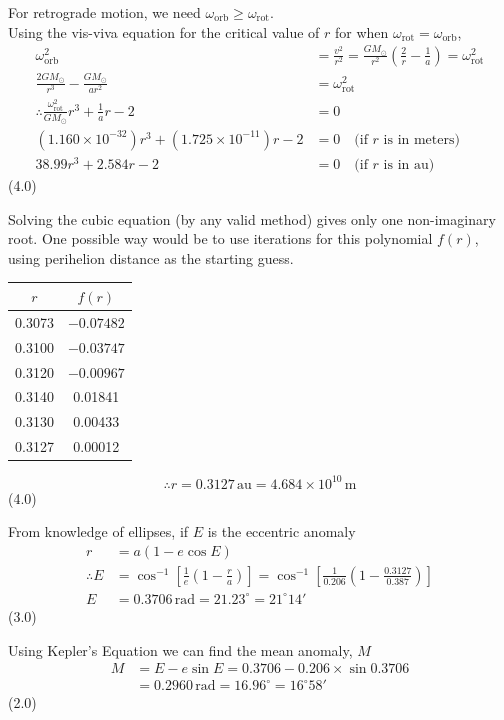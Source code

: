 For retrograde motion, we need $\omega_{\mathrm{orb}} \ge \omega_{\mathrm{rot}}$.\\
Using the vis-viva equation for the critical value of $r$ for when
$\omega_{\mathrm{rot}} = \omega_{\mathrm{orb}}$,
\begin{align*}
\omega_{\mathrm{orb}}^2 &= \frac{v^2}{r^2}
  = \frac{GM_\odot}{r^2}\left(\frac{2}{r} - \frac{1}{a}\right) = \omega_{\mathrm{rot}}^2\\
\frac{2GM_\odot}{r^3} - \frac{GM_\odot}{ar^2} &= \omega_{\mathrm{rot}}^2\\
\therefore \frac{\omega_{\mathrm{rot}}^2}{GM_\odot}r^3 + \frac{1}{a}r - 2 &= 0\\
(1.160\times10^{-32})r^3 + (1.725\times10^{-11})r - 2 &= 0 \quad
  \text{(if $r$ is in meters)}\\
38.99r^3 + 2.584r - 2 &= 0 \quad \text{(if $r$ is in au)}
\end{align*}
\hfill(4.0)

Solving the cubic equation (by any valid method) gives only one non-imaginary root.
One possible way would be to use iterations for this polynomial $f(r)$, using perihelion
distance as the starting guess.
\begin{center}
\begin{tabular}{c|c}
$r$ & $f(r)$\\
\hline
0.3073 & $-0.07482$\\
0.3100 & $-0.03747$\\
0.3120 & $-0.00967$\\
0.3140 & 0.01841\\
0.3130 & 0.00433\\
0.3127 & 0.00012\\
\end{tabular}
\end{center}
\[
\therefore r = 0.3127\,\mathrm{au} = 4.684\times10^{10}\,\mathrm{m}
\]
\hfill(4.0)

From knowledge of ellipses, if $E$ is the eccentric anomaly
\begin{align*}
r &= a(1 - e\cos E)\\
\therefore E &= \cos^{-1}\left[\frac{1}{e}\left(1 - \frac{r}{a}\right)\right]
  = \cos^{-1}\left[\frac{1}{0.206}\left(1 - \frac{0.3127}{0.387}\right)\right]\\
E &= 0.3706\,\mathrm{rad} = 21.23^\circ = 21^\circ 14'
\end{align*}
\hfill(3.0)

Using Kepler's Equation we can find the mean anomaly, $M$
\begin{align*}
M &= E - e\sin E = 0.3706 - 0.206 \times \sin 0.3706\\
  &= 0.2960\,\mathrm{rad} = 16.96^\circ = 16^\circ 58'
\end{align*}
\hfill(2.0)

